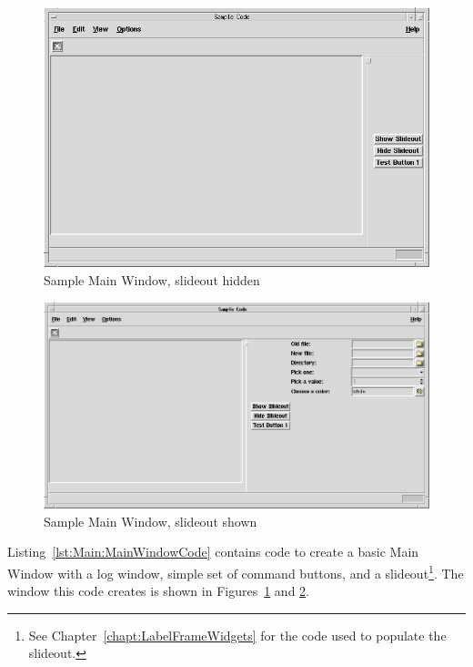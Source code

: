 
\begin{figure}[hbpt]
\begin{centering}
\includegraphics[width=5in]{MainWindow1.png}
\caption{Sample Main Window, slideout hidden}
\label{fig:Main:MainWindow1}
\end{centering}
\end{figure}
\begin{figure}[hbpt]
\begin{centering}
\includegraphics[width=5in]{MainWindow2.png}
\caption{Sample Main Window, slideout shown}
\label{fig:Main:MainWindow2}
\end{centering}
\end{figure}
Listing~\ref{lst:Main:MainWindowCode} contains code to create a basic
Main Window with a log window, simple set of command buttons, and a
slideout\footnote{See Chapter~\ref{chapt:LabelFrameWidgets} for the code used
to populate the slideout.}.  The window this code creates is shown in
Figures~\ref{fig:Main:MainWindow1} and \ref{fig:Main:MainWindow2}.
